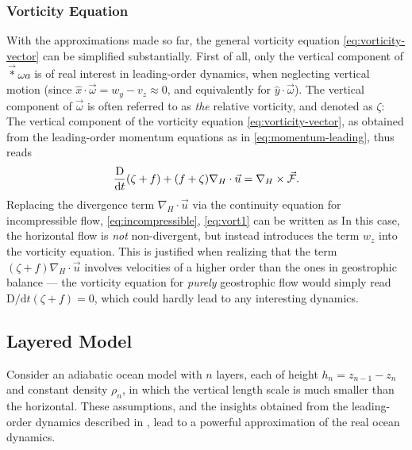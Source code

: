 \subsubsection{Vorticity Equation}
With the approximations made so far, the general vorticity equation \eqref{eq:vorticity-vector} can be simplified substantially. First of all, only the vertical component of \(\vec*{\omega}{a}\) is of real interest in leading-order dynamics, \ie when neglecting vertical motion (since \(\hat{x}\cdot\vec{\omega} = w_y - v_z \approx 0\), and equivalently for \(\hat{y}\cdot\vec{\omega}\)). The vertical component of \(\vec{\omega}\) is often referred to as \emph{the} relative vorticity, and denoted as \(\zeta\):
%
%
The vertical component of the vorticity equation \eqref{eq:vorticity-vector}, as obtained from the leading-order momentum equations as in \eqref{eq:momentum-leading}, thus reads
%
\begin{equation}
\frac{\text{D}}{\text{d}t} (\zeta + f) + (f + \zeta) \nabla_H \cdot \vec{u} = \nabla_H \times \vec{\mathcal{F}}. \label{eq:vort1}
\end{equation}
%
Replacing the divergence term \(\nabla_H \cdot \vec{u}\) via the continuity equation for incompressible flow, \eqref{eq:incompressible}, \eqref{eq:vort1} can be written as
%
%
In this case, the horizontal flow is \emph{not} non-divergent, but instead introduces the term \(w_z\) into the vorticity equation. This is justified when realizing that the term \((\zeta + f)\nabla_H \cdot \vec{u}\) involves velocities of a higher order than the ones in geostrophic balance --- the vorticity equation for \emph{purely} geostrophic flow would simply read \(\text{D}/\text{d}t(\zeta + f) = 0\), which could hardly lead to any interesting dynamics.

\subsection{Layered Model}
\label{sec:physics-layered}
Consider an adiabatic ocean model with \(n\) layers, each of height \(h_n = z_{n-1} - z_{n}\) and constant density \(\rho_n\), in which the vertical length scale is much smaller than the horizontal. These assumptions, and the insights obtained from the leading-order dynamics described in , lead to a powerful approximation of the real ocean dynamics.

